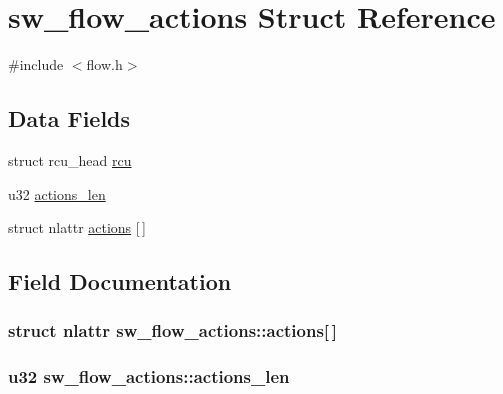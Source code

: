 \hypertarget{structsw__flow__actions}{}\section{sw\+\_\+flow\+\_\+actions Struct Reference}
\label{structsw__flow__actions}


{\ttfamily \#include $<$flow.\+h$>$}

\subsection*{Data Fields}
\begin{DoxyCompactItemize}
\item 
struct rcu\+\_\+head \hyperlink{structsw__flow__actions_aaf3da3f7607ed9dd956fd8c6e1290831}{rcu}
\item 
u32 \hyperlink{structsw__flow__actions_ad18c83862d211746fc0542eabff148a5}{actions\+\_\+len}
\item 
struct nlattr \hyperlink{structsw__flow__actions_ae091e053b6fbc25174a28e97282cbe36}{actions} \mbox{[}$\,$\mbox{]}
\end{DoxyCompactItemize}


\subsection{Field Documentation}
\hypertarget{structsw__flow__actions_ae091e053b6fbc25174a28e97282cbe36}{}
\subsubsection[{actions}]{\setlength{\rightskip}{0pt plus 5cm}struct nlattr sw\+\_\+flow\+\_\+actions\+::actions\mbox{[}$\,$\mbox{]}}\label{structsw__flow__actions_ae091e053b6fbc25174a28e97282cbe36}
\hypertarget{structsw__flow__actions_ad18c83862d211746fc0542eabff148a5}{}
\subsubsection[{actions\+\_\+len}]{\setlength{\rightskip}{0pt plus 5cm}u32 sw\+\_\+flow\+\_\+actions\+::actions\+\_\+len}\label{structsw__flow__actions_ad18c83862d211746fc0542eabff148a5}
\hypertarget{structsw__flow__actions_aaf3da3f7607ed9dd956fd8c6e1290831}{}
